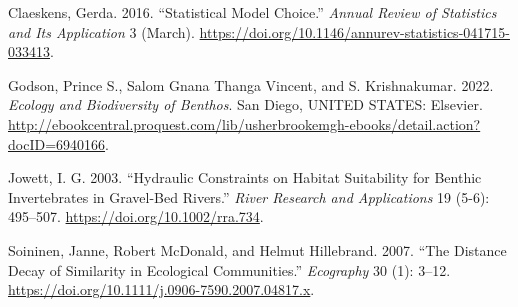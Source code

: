 \documentclass[9pt,twocolumn,twoside,]{pnas-new}
\newlength{\cslhangindent}
\newlength{\cslentryspacingunit} %
\newenvironment{CSLReferences}[2] %
 {%
  \setlength{\parindent}{0pt}
  \ifodd #1
  \let\oldpar\par
  \def\par{\hangindent=\cslhangindent\oldpar}
  \fi
  \setlength{\parskip}{#2\cslentryspacingunit}
 }%
 {}
\begin{document}
\showmatmethods
\showacknow
\pnasbreak

\hypertarget{refs}{}
\begin{CSLReferences}{1}{0}
\leavevmode{}%
Claeskens, Gerda. 2016. {``Statistical {Model} {Choice}.''} \emph{Annual
Review of Statistics and Its Application} 3 (March).
\url{https://doi.org/10.1146/annurev-statistics-041715-033413}.

\leavevmode{}%
Godson, Prince S., Salom Gnana Thanga Vincent, and S. Krishnakumar.
2022. \emph{Ecology and {Biodiversity} of {Benthos}}. San Diego, UNITED
STATES: Elsevier.
\url{http://ebookcentral.proquest.com/lib/usherbrookemgh-ebooks/detail.action?docID=6940166}.

\leavevmode{}%
Jowett, I. G. 2003. {``Hydraulic Constraints on Habitat Suitability for
Benthic Invertebrates in Gravel-Bed Rivers.''} \emph{River Research and
Applications} 19 (5-6): 495--507. \url{https://doi.org/10.1002/rra.734}.

\leavevmode{}%
Soininen, Janne, Robert McDonald, and Helmut Hillebrand. 2007. {``The
Distance Decay of Similarity in Ecological Communities.''}
\emph{Ecography} 30 (1): 3--12.
\url{https://doi.org/10.1111/j.0906-7590.2007.04817.x}.

\end{CSLReferences}



% 
\end{document}
